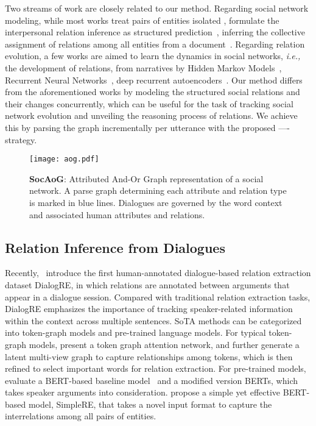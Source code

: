 \documentclass[11pt,a4paper]{article}
\begin{document}
Two streams of work are closely related to our method. Regarding social network modeling, while most works treat pairs of entities isolated \cite{yu-etal-2020-dialogue, xue2020gdpnet, chen2020dialogue}, \citet{srivastava2016inferring} formulate the interpersonal relation inference as structured prediction~\citep{belanger2016structured, qiu-etal-2020-structured, zhao2020vertical}, inferring the collective assignment of relations among all entities from a document~\citep{li-etal-2020-high, jin2020relation}. Regarding relation evolution, a few works are aimed to learn the dynamics in social networks, \textit{i.e.,} the development of relations, from narratives by Hidden Markov Models~\citep{chaturvedi2017unsupervised}, Recurrent Neural Networks~\citep{kim-klinger-2019-frowning}, deep recurrent autoencoders~\citep{iyyer-etal-2016-feuding}. Our method differs from the aforementioned works by modeling the structured social relations and their changes concurrently, which can be useful for the task of tracking social network evolution \cite{doreian1997dynamics} and unveiling the reasoning process of relations. We achieve this by parsing the graph incrementally per utterance with the proposed ---- strategy. 


\begin{figure*}[ht]
\begin{center}
\centerline{\texttt{[image: aog.pdf]}}
\caption{\textbf{SocAoG}: Attributed And-Or Graph representation of a social network. A parse graph determining each attribute and relation type is marked in blue lines. Dialogues are governed by the word context and associated human attributes and relations.}
\label{fig:aog}
\end{center}
\vspace{-10mm}
\end{figure*}
\subsection{Relation Inference from Dialogues}
Recently,~\citet{yu-etal-2020-dialogue} introduce the first human-annotated dialogue-based relation extraction dataset DialogRE, in which relations are annotated between arguments that appear in a dialogue session. Compared with traditional relation extraction tasks, DialogRE emphasizes the importance of tracking speaker-related information within the context across multiple sentences. SoTA methods can be categorized into token-graph models and pre-trained language models. For typical token-graph models, \citet{chen2020dialogue} present a token graph attention network, and \citet{xue2020gdpnet} further generate a latent multi-view graph to capture relationships among tokens, which is then refined to select important words for relation extraction. For pre-trained models, \citet{yu-etal-2020-dialogue} evaluate a BERT-based baseline model~\citep{devlin2018bert} and a modified version BERTs, which takes speaker arguments into consideration. \citet{xue2020embarrassingly} propose a simple yet effective BERT-based model, SimpleRE, that takes a novel input format to capture the interrelations among all pairs of entities. 
\end{document}
